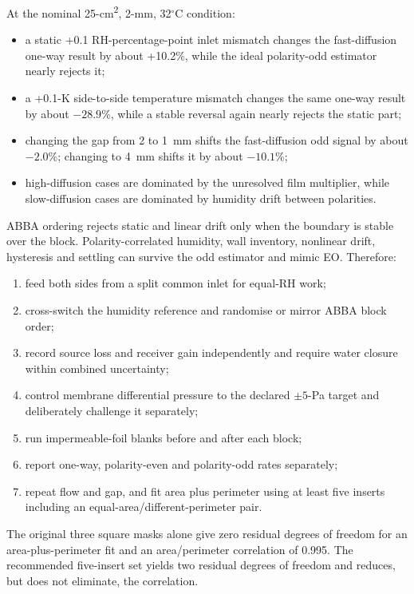 \documentclass[10pt,a4paper]{article}
\begin{document}
At the nominal 25-cm\textsuperscript{2}, 2-mm, 32$^\circ$C condition:
\begin{itemize}
  \item a static +0.1 RH-percentage-point inlet mismatch changes the
        fast-diffusion one-way result by about +10.2\%, while the ideal
        polarity-odd estimator nearly rejects it;
  \item a +0.1-K side-to-side temperature mismatch changes the same one-way
        result by about $-28.9$\%, while a stable reversal again nearly
        rejects the static part;
  \item changing the gap from 2 to 1~mm shifts the fast-diffusion odd signal
        by about $-2.0$\%; changing to 4~mm shifts it by about $-10.1$\%;
  \item high-diffusion cases are dominated by the unresolved film multiplier,
        while slow-diffusion cases are dominated by humidity drift between
        polarities.
\end{itemize}

ABBA ordering rejects static and linear drift only when the boundary is stable
over the block. Polarity-correlated humidity, wall inventory, nonlinear drift,
hysteresis and settling can survive the odd estimator and mimic EO. Therefore:
\begin{enumerate}
  \item feed both sides from a split common inlet for equal-RH work;
  \item cross-switch the humidity reference and randomise or mirror ABBA block
        order;
  \item record source loss and receiver gain independently and require water
        closure within combined uncertainty;
  \item control membrane differential pressure to the declared $\pm5$-Pa
        target and deliberately challenge it separately;
  \item run impermeable-foil blanks before and after each block;
  \item report one-way, polarity-even and polarity-odd rates separately;
  \item repeat flow and gap, and fit area plus perimeter using at least five
        inserts including an equal-area/different-perimeter pair.
\end{enumerate}

The original three square masks alone give zero residual degrees of freedom
for an area-plus-perimeter fit and an area/perimeter correlation of 0.995.
The recommended five-insert set yields two residual degrees of freedom and
reduces, but does not eliminate, the correlation.
\end{document}
